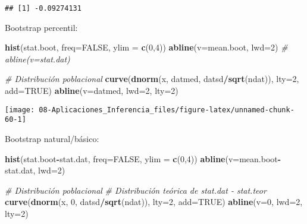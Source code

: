 \documentclass[
]{book}
\newenvironment{Shaded}{\begin{snugshade}}{\end{snugshade}}
\newcommand{\CommentTok}[1]{\textcolor[rgb]{0.56,0.35,0.01}{\textit{#1}}}
\newcommand{\DataTypeTok}[1]{\textcolor[rgb]{0.13,0.29,0.53}{#1}}
\newcommand{\DecValTok}[1]{\textcolor[rgb]{0.00,0.00,0.81}{#1}}
\newcommand{\KeywordTok}[1]{\textcolor[rgb]{0.13,0.29,0.53}{\textbf{#1}}}
\newcommand{\NormalTok}[1]{#1}
\newcommand{\OperatorTok}[1]{\textcolor[rgb]{0.81,0.36,0.00}{\textbf{#1}}}
\newcommand{\OtherTok}[1]{\textcolor[rgb]{0.56,0.35,0.01}{#1}}
\theoremstyle{break}
\theoremstyle{definition}
\theoremstyle{definition}
\theoremstyle{definition}
\theoremstyle{remark}
\begin{document}
\begin{verbatim}
## [1] -0.09274131
\end{verbatim}

Bootstrap percentil:

\begin{Shaded}
\begin{Highlighting}[]
\KeywordTok{hist}\NormalTok{(stat.boot, }\DataTypeTok{freq=}\OtherTok{FALSE}\NormalTok{, }\DataTypeTok{ylim =} \KeywordTok{c}\NormalTok{(}\DecValTok{0}\NormalTok{,}\DecValTok{4}\NormalTok{))}
\KeywordTok{abline}\NormalTok{(}\DataTypeTok{v=}\NormalTok{mean.boot, }\DataTypeTok{lwd=}\DecValTok{2}\NormalTok{)}
\CommentTok{# abline(v=stat.dat)}

\CommentTok{# Distribución poblacional}
\KeywordTok{curve}\NormalTok{(}\KeywordTok{dnorm}\NormalTok{(x, datmed, datsd}\OperatorTok{/}\KeywordTok{sqrt}\NormalTok{(ndat)), }\DataTypeTok{lty=}\DecValTok{2}\NormalTok{, }\DataTypeTok{add=}\OtherTok{TRUE}\NormalTok{)}
\KeywordTok{abline}\NormalTok{(}\DataTypeTok{v=}\NormalTok{datmed, }\DataTypeTok{lwd=}\DecValTok{2}\NormalTok{, }\DataTypeTok{lty=}\DecValTok{2}\NormalTok{)}
\end{Highlighting}
\end{Shaded}

\begin{center}\texttt{[image: 08-Aplicaciones\_Inferencia\_files/figure-latex/unnamed-chunk-60-1]} \end{center}

Bootstrap natural/básico:

\begin{Shaded}
\begin{Highlighting}[]
\KeywordTok{hist}\NormalTok{(stat.boot}\OperatorTok{-}\NormalTok{stat.dat, }\DataTypeTok{freq=}\OtherTok{FALSE}\NormalTok{, }\DataTypeTok{ylim =} \KeywordTok{c}\NormalTok{(}\DecValTok{0}\NormalTok{,}\DecValTok{4}\NormalTok{))}
\KeywordTok{abline}\NormalTok{(}\DataTypeTok{v=}\NormalTok{mean.boot}\OperatorTok{-}\NormalTok{stat.dat, }\DataTypeTok{lwd=}\DecValTok{2}\NormalTok{)}

\CommentTok{# Distribución poblacional}
\CommentTok{# Distribución teórica de stat.dat - stat.teor}
\KeywordTok{curve}\NormalTok{(}\KeywordTok{dnorm}\NormalTok{(x, }\DecValTok{0}\NormalTok{, datsd}\OperatorTok{/}\KeywordTok{sqrt}\NormalTok{(ndat)), }\DataTypeTok{lty=}\DecValTok{2}\NormalTok{, }\DataTypeTok{add=}\OtherTok{TRUE}\NormalTok{)   }
\KeywordTok{abline}\NormalTok{(}\DataTypeTok{v=}\DecValTok{0}\NormalTok{, }\DataTypeTok{lwd=}\DecValTok{2}\NormalTok{, }\DataTypeTok{lty=}\DecValTok{2}\NormalTok{)}
\end{Highlighting}
\end{Shaded}
\end{document}
